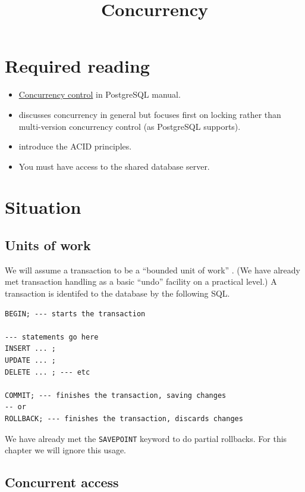 \documentclass[slides]{pgnotes}
\title{Concurrency}
\begin{document}
\maketitle

\section*{Required reading}

\begin{itemize}
\item \href{https://www.postgresql.org/docs/13/mvcc.html}{Concurrency control} in PostgreSQL manual.
\item \citep[Chapter 22]{connolly:2015:database} discusses concurrency in general but focuses first on locking rather than multi-version concurrency control (as PostgreSQL supports).
\item \citep{haerder:1983:principles} introduce the ACID principles.
\item You must have access to the shared database server.
\end{itemize}

\section{Situation}

\subsection{Units of work}

We will assume a transaction to be a ``bounded unit of work'' \citep{fowler:2003:patterns}.
(We have already met transaction handling as a basic ``undo'' facility on a practical level.) 
A transaction is identifed to the database by the following SQL. 

\begin{verbatim}
BEGIN; --- starts the transaction

--- statements go here
INSERT ... ;
UPDATE ... ;
DELETE ... ; --- etc

COMMIT; --- finishes the transaction, saving changes
-- or
ROLLBACK; --- finishes the transaction, discards changes
\end{verbatim}

We have already met the \texttt{SAVEPOINT} keyword to do partial rollbacks.
For this chapter we will ignore this usage.

\subsection{Concurrent access}
\end{document}

